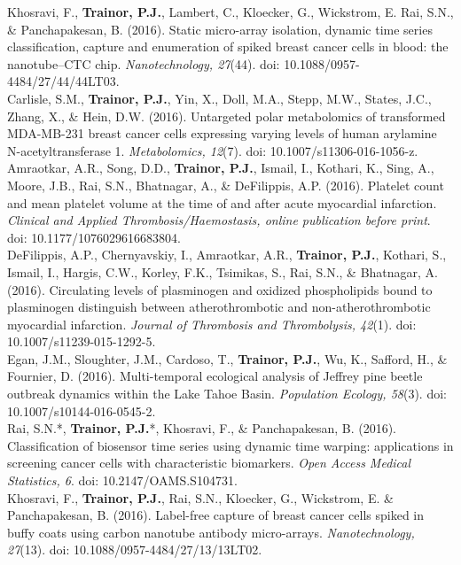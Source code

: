 Khosravi, F., \textbf{Trainor, P.J.}, Lambert, C., Kloecker, G., Wickstrom, E. Rai, S.N., \& Panchapakesan, B. (2016). Static micro-array isolation, dynamic time series classification, capture and enumeration of spiked breast cancer cells in blood: the nanotube--CTC chip. \emph{Nanotechnology, 27}(44). doi: 10.1088/0957-4484/27/44/44LT03. \\

Carlisle, S.M., \textbf{Trainor, P.J.}, Yin, X., Doll, M.A., Stepp, M.W., States, J.C., Zhang, X., \& Hein, D.W. (2016). Untargeted polar metabolomics of transformed MDA-MB-231 breast cancer cells expressing varying levels of human arylamine N-acetyltransferase 1. \emph{Metabolomics, 12}(7). doi: 10.1007/s11306-016-1056-z. \\

Amraotkar, A.R., Song, D.D., \textbf{Trainor, P.J.}, Ismail, I., Kothari, K., Sing, A., Moore, J.B., Rai, S.N., Bhatnagar, A., \& DeFilippis, A.P. (2016). Platelet count and mean platelet volume at the time of and after acute myocardial infarction. \emph{Clinical and Applied Thrombosis/Haemostasis, online publication before print}. doi: 10.1177/1076029616683804. \\ 

DeFilippis, A.P., Chernyavskiy, I., Amraotkar, A.R., \textbf{Trainor, P.J.}, 
Kothari, S., Ismail, I., Hargis, C.W., Korley, F.K., Tsimikas, S., Rai, S.N., \& Bhatnagar, A. (2016). Circulating levels of plasminogen and oxidized phospholipids bound to plasminogen distinguish between atherothrombotic and non-atherothrombotic myocardial infarction. \emph{Journal of Thrombosis and Thrombolysis, 42}(1). doi: 10.1007/s11239-015-1292-5. \\

Egan, J.M., Sloughter, J.M., Cardoso, T., \textbf{Trainor, P.J.}, Wu, K., Safford, H., \& Fournier, D. (2016). Multi-temporal ecological analysis of Jeffrey pine beetle outbreak dynamics within the Lake Tahoe Basin. \emph{Population Ecology, 58}(3). doi: 10.1007/s10144-016-0545-2. \\

Rai, S.N.*, \textbf{Trainor, P.J.}*, Khosravi, F., \& Panchapakesan, B.  (2016). Classification of biosensor time series using dynamic time warping: applications in screening cancer cells with characteristic biomarkers. \emph{Open Access Medical Statistics, 6}. doi: 10.2147/OAMS.S104731. \\

Khosravi, F., \textbf{Trainor, P.J.}, Rai, S.N., Kloecker, G., Wickstrom, E. \& Panchapakesan, B. (2016). Label-free capture of breast cancer cells spiked in buffy coats using carbon nanotube antibody micro-arrays. \emph{Nanotechnology, 27}(13). doi: 10.1088/0957-4484/27/13/13LT02. \\

